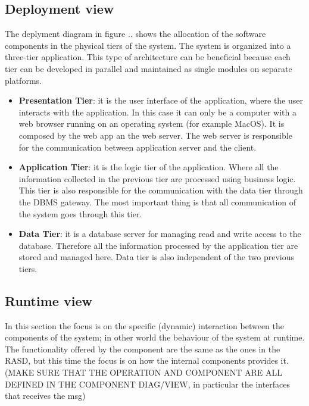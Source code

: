 \subsection{Deployment view}
The deplyment diagram in figure .. shows the allocation of the software components in the physical tiers of the system. 
The system is organized into a three-tier application. This type of architecture can be 
beneficial because each tier can be developed in parallel and maintained as single modules on separate platforms.


\begin{itemize}
    \item \textbf{Presentation Tier}: it is the user interface of the application, where the user interacts with the application. 
    In this case it can only be a computer with a web browser running on an operating system (for example MacOS).
    It is composed by the web app an the web server. The web server is responsible for the communication between application server 
    and the client.

    \item \textbf{Application Tier}: it is the logic tier of the application. Where all the information 
    collected in the previous tier are processed using business logic. This tier is also 
    responsible for the communication with the data tier through the DBMS gateway.
    The most important thing is that all communication of the system goes through this tier.

    \item \textbf{Data Tier}: it is a database server for managing read and write access to the database. 
    Therefore all the information processed by the application tier are stored and managed here.
    Data tier is also independent of the two previous tiers. 
\end{itemize}
\subsection{Runtime view}

In this section the focus is on the specific (dynamic) interaction between the components of the system; in other world the behaviour of the system at runtime.
The functionality offered by the component are the same as the ones in the RASD, but this time the focus is on how the internal components provides it.
(MAKE SURE THAT THE OPERATION AND COMPONENT ARE ALL DEFINED IN THE COMPONENT DIAG/VIEW, in particular the interfaces that receives the msg)

